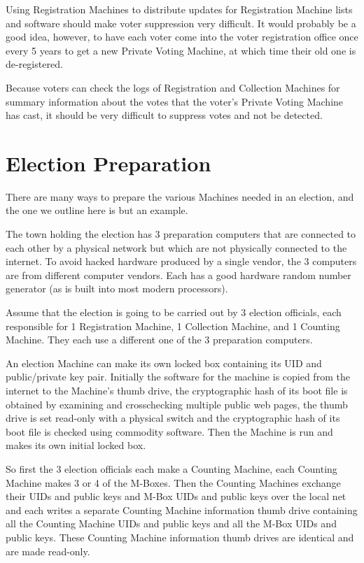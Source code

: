 \documentclass[12pt]{article}
\begin{document}
Using Registration Machines to distribute updates for Registration
Machine lists and software should make voter suppression very difficult.
It would probably be a good idea, however, to have each voter come into
the voter registration office once every 5 years to get a new
Private Voting Machine, at which time their old one is de-registered.

Because voters can check the logs of Registration and Collection Machines
for summary information about the votes that the voter's Private Voting Machine
has cast, it should be very difficult to suppress votes and not be detected.

\section{Election Preparation}

There are many ways to prepare the various Machines needed in an election,
and the one we outline here is but an example.

The town holding the election has 3 preparation computers that are
connected to each other by a physical network but which are not
physically connected to the internet.  To avoid hacked hardware
produced by a single vendor, the 3 computers are from different
computer vendors.  Each has a good hardware random number generator
(as is built into most modern processors).

Assume that the election is going to be carried out by 3 election
officials, each responsible for 1 Registration Machine, 1 Collection
Machine, and 1 Counting Machine.  They each use a different one of
the 3 preparation computers.

An election Machine can make its own locked box containing its UID
and public/private key pair.  Initially the software for the machine
is copied from the internet to the Machine's thumb drive,
the cryptographic hash of its boot file is obtained by examining
and crosschecking multiple public web pages, the thumb
drive is set read-only with a physical switch and the cryptographic
hash of its boot file is checked using commodity software.
Then the Machine is run and makes its own initial locked box.

So first the 3 election officials each make a Counting Machine,
each Counting Machine makes 3 or 4 of the M-Boxes.  Then
the Counting Machines exchange their UIDs and public keys and M-Box
UIDs and public keys over the local net
and each writes a separate Counting Machine information
thumb drive containing all the
Counting Machine UIDs and public keys and all the M-Box UIDs and
public keys.  These Counting Machine information
thumb drives are identical and are made read-only.
\end{document}
